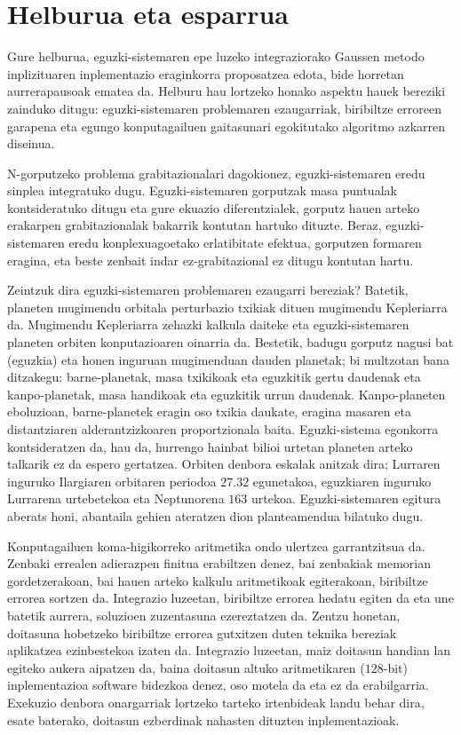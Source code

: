 \section{Helburua eta esparrua}

Gure helburua, eguzki-sistemaren epe luzeko integraziorako Gaussen metodo inplizituaren inplementazio eraginkorra proposatzea edota, bide horretan aurrerapausoak ematea da. Helburu hau lortzeko honako aspektu hauek bereziki zainduko ditugu: eguzki-sistemaren problemaren ezaugarriak, biribiltze erroreen garapena eta egungo konputagailuen gaitasunari egokitutako algoritmo azkarren diseinua.  

N-gorputzeko problema grabitazionalari dagokionez, eguzki-sistemaren eredu sinplea integratuko dugu. Eguzki-sistemaren gorputzak masa puntualak kontsideratuko ditugu eta gure ekuazio diferentzialek, gorputz hauen arteko erakarpen grabitazionalak bakarrik kontutan hartuko dituzte. Beraz, eguzki-sistemaren eredu konplexuagoetako erlatibitate efektua, gorputzen formaren eragina, eta beste zenbait indar ez-grabitazional ez ditugu kontutan hartu.

Zeintzuk dira eguzki-sistemaren problemaren ezaugarri bereziak? Batetik, planeten mugimendu orbitala perturbazio txikiak dituen mugimendu Kepleriarra da. Mugimendu Kepleriarra  zehazki kalkula daiteke eta eguzki-sistemaren planeten orbiten konputazioaren oinarria da. Bestetik,  badugu gorputz nagusi bat (eguzkia) eta honen inguruan mugimenduan dauden planetak; bi multzotan bana ditzakegu: barne-planetak, masa txikikoak eta eguzkitik gertu daudenak eta kanpo-planetak, masa handikoak eta eguzkitik urrun daudenak. Kanpo-planeten eboluzioan, barne-planetek eragin oso txikia daukate, eragina masaren eta distantziaren alderantzizkoaren proportzionala baita.  Eguzki-sistema egonkorra kontsideratzen da, hau da, hurrengo hainbat bilioi urtetan planeten arteko talkarik ez da espero gertatzea. Orbiten denbora eskalak anitzak dira; Lurraren inguruko Ilargiaren orbitaren periodoa $27.32$ egunetakoa, eguzkiaren inguruko Lurrarena urtebetekoa eta Neptunorena $163$ urtekoa.  Eguzki-sistemaren egitura aberats honi, abantaila gehien ateratzen dion planteamendua bilatuko dugu.
  
Konputagailuen koma-higikorreko aritmetika ondo ulertzea garrantzitsua da. Zenbaki errealen adierazpen finitua erabiltzen denez, bai zenbakiak memorian gordetzerakoan, bai hauen arteko kalkulu aritmetikoak egiterakoan, biribiltze errorea sortzen da. Integrazio luzeetan, biribiltze errorea hedatu egiten da eta une batetik aurrera, soluzioen zuzentasuna ezereztatzen da. Zentzu honetan, doitasuna hobetzeko biribiltze errorea gutxitzen duten teknika bereziak aplikatzea ezinbestekoa izaten da. Integrazio luzeetan, maiz doitasun handian lan egiteko aukera aipatzen da, baina doitasun altuko aritmetikaren ($128$-bit) inplementazioa software bidezkoa denez, oso motela da eta ez da erabilgarria. Exekuzio denbora onargarriak lortzeko tarteko irtenbideak landu behar dira, esate baterako, doitasun ezberdinak nahasten dituzten inplementazioak.       

